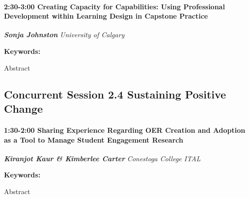 \documentclass[
]{book}
\begin{document}
\begin{session}
\hypertarget{creating-capacity-for-capabilities-using-professional-development-within-learning-design-in-capstone-practice}{%
\paragraph*{\texorpdfstring{2:30-3:00 \textbar{} \textbf{Creating
Capacity for Capabilities: Using Professional Development within
Learning Design in Capstone} \textbar{}
Practice}{2:30-3:00 \textbar{} Creating Capacity for Capabilities: Using Professional Development within Learning Design in Capstone \textbar{} Practice}}\label{creating-capacity-for-capabilities-using-professional-development-within-learning-design-in-capstone-practice}}

\textbf{\emph{Sonja Johnston}} \textbar{} \emph{University of Calgary}

\textbf{Keywords:}

Abstract
\end{session}

\hypertarget{concurrent-session-2.4-sustaining-positive-change}{%
\subsection*{Concurrent Session 2.4 \textbar{} Sustaining Positive Change}\label{concurrent-session-2.4-sustaining-positive-change}}

\begin{session}
\hypertarget{sharing-experience-regarding-oer-creation-and-adoption-as-a-tool-to-manage-student-engagement-research}{%
\paragraph*{\texorpdfstring{1:30-2:00 \textbar{} \textbf{Sharing
Experience Regarding OER Creation and Adoption as a Tool to Manage
Student Engagement} \textbar{}
Research}{1:30-2:00 \textbar{} Sharing Experience Regarding OER Creation and Adoption as a Tool to Manage Student Engagement \textbar{} Research}}\label{sharing-experience-regarding-oer-creation-and-adoption-as-a-tool-to-manage-student-engagement-research}}

\textbf{\emph{Kiranjot Kaur \& Kimberlee Carter}} \textbar{}
\emph{Conestoga College ITAL}

\textbf{Keywords:}

Abstract
\end{session}
\end{document}
